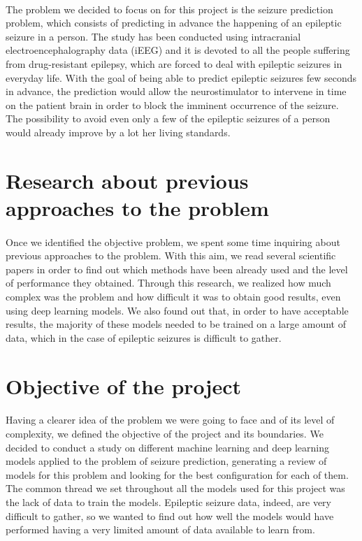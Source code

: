 \paragraph{} The problem we decided to focus on for this project is the seizure prediction problem, which consists of predicting in advance the happening of an epileptic seizure in a person. The study has been conducted using intracranial electroencephalography data (iEEG) and it is devoted to all the people suffering from drug-resistant epilepsy, which are forced to deal with epileptic seizures in everyday life. With the goal of being able to predict epileptic seizures few seconds in advance, the prediction would allow the neurostimulator to intervene in time on the patient brain in order to block the imminent occurrence of the seizure. The possibility to avoid even only a few of the epileptic seizures of a person would already improve by a lot her living standards.

\section{Research about previous approaches to the problem}
\paragraph{} Once we identified the objective problem, we spent some time inquiring about previous approaches to the problem. With this aim, we read several scientific papers in order to find out which methods have been already used and the level of performance they obtained. Through this research, we realized how much complex was the problem and how difficult it was to obtain good results, even using deep learning models. We also found out that, in order to have acceptable results, the majority of these models needed to be trained on a large amount of data, which in the case of epileptic seizures is difficult to gather.

\section{Objective of the project}
\paragraph{} Having a clearer idea of the problem we were going to face and of its level of complexity, we defined the objective of the project and its boundaries. We decided to conduct a study on different machine learning and deep learning models applied to the problem of seizure prediction, generating a review of models for this problem and looking for the best configuration for each of them. The common thread we set throughout all the models used for this project was the lack of data to train the models. Epileptic seizure data, indeed, are very difficult to gather, so we wanted to find out how well the models would have performed having a very limited amount of data available to learn from.

